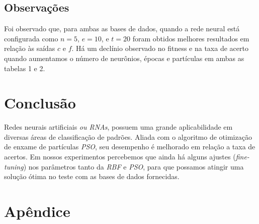 \documentclass[10pt,twocolumn,letterpaper]{article}
\begin{document}
\subsection{Observações}
Foi observado que, para ambas as bases de dados, quando a rede neural está configurada como $n=5$, $e=10$, e $t=20$ foram obtidos melhores resultados em relação às saídas $c$ e $f$. Há um declínio observado no fitness e na taxa de acerto quando aumentamos o número de neurônios, épocas e partículas em ambas as tabelas 1 e 2.

\section{Conclusão}
Redes neurais artificiais \textit{ou RNAs}, possuem uma grande aplicabilidade em diversas áreas de classificação de padrões. Aliada com o algoritmo de otimização de enxame de partículas \textit{PSO}, seu desempenho é melhorado em relação a taxa de acertos. Em nossos experimentos percebemos que ainda há alguns ajustes (\textit{fine-tuning}) nos parâmetros tanto da \textit{RBF} e \textit{PSO}, para que possamos atingir uma solução ótima no teste com as bases de dados fornecidas.
{\small


}

\onecolumn
\section*{Apêndice}
\end{document}
